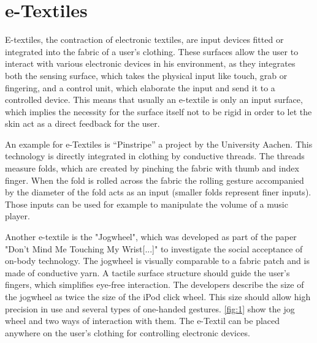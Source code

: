 \documentclass{sigchi}
\begin{document}
\section{e-Textiles}
E-textiles, the contraction of electronic textiles, are input devices fitted or integrated into the fabric of a user's clothing. These surfaces allow the user to interact with various electronic devices in his environment, as they integrates both the sensing surface, which takes the physical input like touch, grab or fingering,  and a control unit, which elaborate the input and send it to a controlled device. This means that usually an e-textile is only an input surface, which implies the necessity for the surface itself not to be rigid in order to let the skin act as a direct feedback for the user.

An example for e-Textiles is “Pinstripe” a project by the University Aachen. This technology is directly integrated in clothing by conductive threads. The threads measure folds, which are created by pinching the fabric with thumb and index finger. When the fold is rolled across the fabric the rolling gesture accompanied by the diameter of the fold acts as an input (smaller folds represent finer inputs). Those inputs can be used for example to manipulate the volume of a music player. \cite{pinstripe}%

Another e-textile is the "Jogwheel", which was developed as part of the paper "Don't Mind Me Touching My Wrist[...]" \cite{touch-wrist} to investigate the social acceptance of on-body technology. The jogwheel is visually comparable to a fabric patch and is made of conductive yarn. A tactile surface structure should guide the user's fingers, which simplifies eye-free interaction. The developers describe the size of the jogwheel as twice the size of the iPod click wheel. This size should allow high precision in use and several types of one-handed gestures.
\ref{fig:1} show the jog wheel and two ways of interaction with them. The e-Textil can be placed anywhere on the user's clothing for controlling electronic devices. \cite{touch-wrist}
\end{document}

